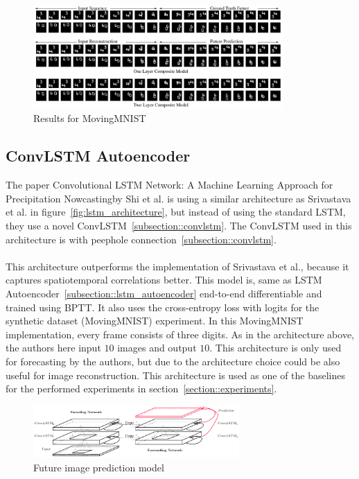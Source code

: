   \begin{figure}[H]
   \includegraphics[width=0.85\textwidth]{../Images/srivastava_results_mnist.png}
   \centering
   \caption{Results for MovingMNIST \cite{Srivastava2015}}
   \label{fig:lstm_results}
  \end{figure}

 \subsection{ConvLSTM Autoencoder} \label{subsection::convlstm_autoencoder}
  The paper \glqq Convolutional LSTM Network: A Machine Learning Approach for Precipitation Nowcasting\grqq by Shi et al. \citep{Shi2015} is using a similar 
  architecture as Srivastava et al. in
  figure~\ref{fig:lstm_architecture}, but instead of using the standard LSTM, they use a novel ConvLSTM~\ref{subsection::convlstm}. The ConvLSTM used in this 
  architecture is with peephole connection~\ref{subsection::convlstm}.
  \\\\
  This architecture outperforms the implementation of Srivastava et al., because it \glqq captures spatiotemporal correlations better\grqq.
  This model is, same as LSTM Autoencoder~\ref{subsection::lstm_autoencoder} end-to-end differentiable and trained using BPTT. It also uses the cross-entropy loss with logits for the synthetic dataset 
  (MovingMNIST) experiment. In this MovingMNIST implementation, every frame consists of three digits. As in the architecture above, the authors here input $10$ images and output $10$. This architecture is only used for forecasting by the authors, but due to the architecture choice could be also useful for image
  reconstruction. This architecture is used as one of the baselines for the performed experiments in section~\ref{section::experiments}.
  \begin{figure}[H]
   \includegraphics[width=0.7\textwidth]{../Images/shi.png}
   \centering
   \caption{Future image prediction model \cite{Shi2015}}
   \label{fig:convlstm_architecture}
  \end{figure}
